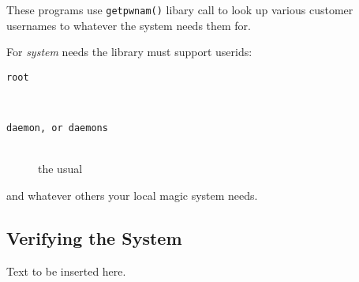 \begin{description}
These programs use {\tt getpwnam()} libary call to look up
various customer usernames to whatever the system needs them
for.

For {\em system} needs the library must support userids:
\begin{description}
\item[\tt root] \mbox{} \\
\item[\tt daemon{\rm , or} daemons] \mbox{} \\
the usual
\end{description}
and whatever others your local magic system needs.
\end{description}

\subsection{Verifying the System}

Text to be inserted here.
